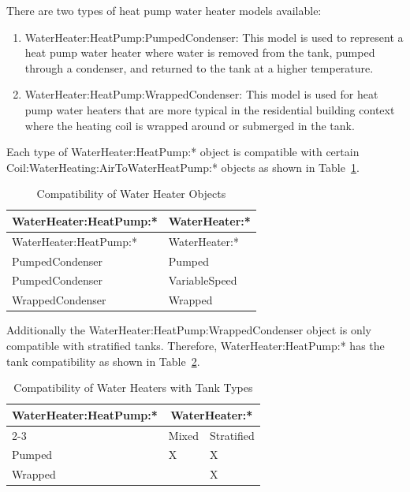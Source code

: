 There are two types of heat pump water heater models available:

\begin{enumerate}
\def\labelenumi{\arabic{enumi}.}
\tightlist
\item WaterHeater:HeatPump:PumpedCondenser: This model is used to represent a heat pump water heater where water is removed from the tank, pumped through a condenser, and returned to the tank at a higher temperature.
\item WaterHeater:HeatPump:WrappedCondenser: This model is used for heat pump water heaters that are more typical in the residential building context where the heating coil is wrapped around or submerged in the tank.
\end{enumerate}

Each type of WaterHeater:HeatPump:* object is compatible with certain Coil:WaterHeating:AirToWaterHeatPump:* objects as shown in Table~\ref{table:compatibility-of-water-heater-objects}.

\begin{longtable}[c]{@{}ll@{}}
\caption{Compatibility of Water Heater Objects \label{table:compatibility-of-water-heater-objects}} \tabularnewline
\toprule
WaterHeater:HeatPump:* & WaterHeater:* \tabularnewline
\midrule
\endfirsthead

\toprule
WaterHeater:HeatPump:* & WaterHeater:* \tabularnewline
\midrule
\endhead

PumpedCondenser & Pumped \tabularnewline
PumpedCondenser & VariableSpeed \tabularnewline
WrappedCondenser & Wrapped \tabularnewline
\bottomrule
\end{longtable}

Additionally the WaterHeater:HeatPump:WrappedCondenser object is only compatible with stratified tanks. Therefore, WaterHeater:HeatPump:* has the tank compatibility as shown in Table~\ref{table:compatibility-of-water-heaters-with-tank-types}.

\begin{longtable}[c]{@{}lll@{}}
\caption{Compatibility of Water Heaters with Tank Types \label{table:compatibility-of-water-heaters-with-tank-types}} \tabularnewline
\toprule
WaterHeater:HeatPump:* & \multicolumn{2}{c}{WaterHeater:*} \tabularnewline
\cmidrule{2-3}
& Mixed & Stratified \tabularnewline
\midrule
\endhead

Pumped & X & X \tabularnewline
Wrapped &  & X \tabularnewline
\bottomrule
\end{longtable}

